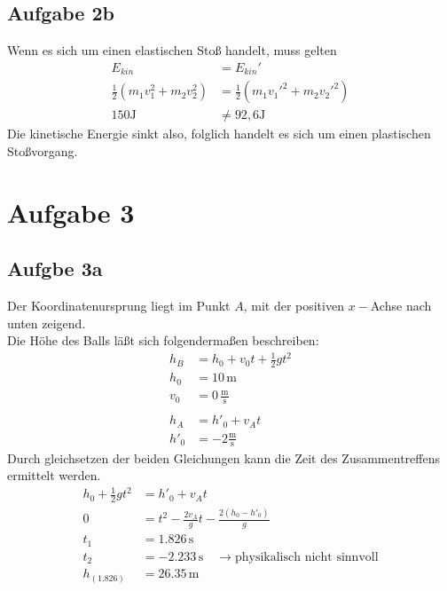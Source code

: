 \documentclass[a4paper,10pt]{extarticle}
\begin{document}
\subsection*{Aufgabe 2b}
Wenn es sich um einen elastischen Stoß handelt, muss gelten
\begin{align*}
  E_{kin} &= E_{kin}'\\
  \frac{1}{2}(m_1v_1^2+m_2v_2^2) &= \frac{1}{2}(m_1v_1'^2+m_2v_2'^2)\\
  150 \mbox{J} &\neq 92,6 \mbox{J}
\end{align*}
Die kinetische Energie sinkt also, folglich handelt es sich um einen plastischen Stoßvorgang.

\section*{Aufgabe 3}
  \subsection*{Aufgbe 3a}
  Der Koordinatenursprung liegt im Punkt $A$, mit der positiven $x-$Achse nach unten zeigend. \\ 
  Die Höhe des Balls läßt sich folgendermaßen beschreiben:
  \begin{align*}
  h_B &= h_0 + v_0 t + \frac{1}{2}gt^2 \\
  h_0 &= 10 \, \mbox{m} \\ 
  v_0 &= 0 \, \frac{\mbox{m}}{\mbox{s}} \\ \\
  h_A &= h'_0 + v_A t \\
  h'_0 &= -2 \frac{\mbox{m}}{\mbox{s}}
  \end{align*}
  Durch gleichsetzen der beiden Gleichungen kann die Zeit des Zusammentreffens ermittelt werden.
  \begin{align*}
  h_0 + \frac{1}{2}gt^2 &= h'_0 + v_A t \\
  0 &= t^2 - \frac{2 v_A}{g} t - \frac{2(h_0 - h'_0)}{g} \\
  t_1 &= 1.826 \, \mbox{s} \\
  t_2 &= -2.233 \, \mbox{s} \quad \rightarrow \mbox{physikalisch nicht sinnvoll}\\
  h_{(1.826)} &= 26.35\, \mbox{m}
  \end{align*}
\end{document}
